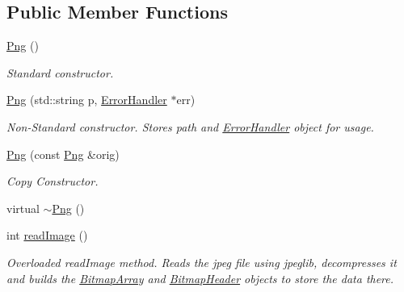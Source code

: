 \subsection*{Public Member Functions}
\begin{DoxyCompactItemize}
\item 
\mbox{\hyperlink{classPng_a1b526fc595b9f38850e1b93e5bb40301}{Png}} ()
\begin{DoxyCompactList}\small\item\em Standard constructor. \end{DoxyCompactList}\item 
\mbox{\hyperlink{classPng_a11aa0090e4a364ac741d4eae05261137}{Png}} (std\+::string p, \mbox{\hyperlink{classErrorHandler}{Error\+Handler}} $\ast$err)
\begin{DoxyCompactList}\small\item\em Non-\/\+Standard constructor. Stores path and \mbox{\hyperlink{classErrorHandler}{Error\+Handler}} object for usage. \end{DoxyCompactList}\item 
\mbox{\hyperlink{classPng_ac23e669b23506fb9d0ccfc1f51f1bcf2}{Png}} (const \mbox{\hyperlink{classPng}{Png}} \&orig)
\begin{DoxyCompactList}\small\item\em Copy Constructor. \end{DoxyCompactList}\item 
virtual \mbox{\hyperlink{classPng_ad26b67ca927b367d4bc294b07f16868d}{$\sim$\+Png}} ()
\item 
int \mbox{\hyperlink{classPng_aa38d2a6baa44bd0b3a932b93ee67e419}{read\+Image}} ()
\begin{DoxyCompactList}\small\item\em Overloaded read\+Image method. Reads the jpeg file using jpeglib, decompresses it and builds the \mbox{\hyperlink{classBitmapArray}{Bitmap\+Array}} and \mbox{\hyperlink{classBitmapHeader}{Bitmap\+Header}} objects to store the data there. \end{DoxyCompactList}\end{DoxyCompactItemize}
